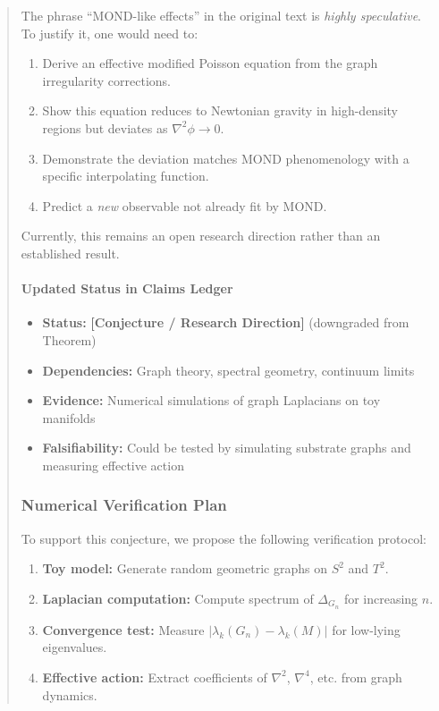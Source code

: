 \documentclass[11pt,titlepage]{article}
\begin{document}
\begin{abstract}
\begin{tcolorbox}[colback=red!5!white,colframe=red!75!black,title=Warning: Speculative Connection]
The phrase ``MOND-like effects'' in the original text is \emph{highly speculative}. To justify it, one would need to:
\begin{enumerate}
\item Derive an effective modified Poisson equation from the graph irregularity corrections.
\item Show this equation reduces to Newtonian gravity in high-density regions but deviates as $\nabla^2 \phi \to 0$.
\item Demonstrate the deviation matches MOND phenomenology with a specific interpolating function.
\item Predict a \emph{new} observable not already fit by MOND.
\end{enumerate}
Currently, this remains an open research direction rather than an established result.
\end{tcolorbox}

\paragraph{Updated Status in Claims Ledger}
\begin{itemize}
\item \textbf{Status:} \textbf{[Conjecture / Research Direction]} (downgraded from Theorem)
\item \textbf{Dependencies:} Graph theory, spectral geometry, continuum limits
\item \textbf{Evidence:} Numerical simulations of graph Laplacians on toy manifolds
\item \textbf{Falsifiability:} Could be tested by simulating substrate graphs and measuring effective action
\end{itemize}

\subsubsection{Numerical Verification Plan}
To support this conjecture, we propose the following verification protocol:

\begin{enumerate}
\item \textbf{Toy model:} Generate random geometric graphs on $S^2$ and $T^2$.
\item \textbf{Laplacian computation:} Compute spectrum of $\Delta_{G_n}$ for increasing $n$.
\item \textbf{Convergence test:} Measure $|\lambda_k(G_n) - \lambda_k(M)|$ for low-lying eigenvalues.
\item \textbf{Effective action:} Extract coefficients of $\nabla^2$, $\nabla^4$, etc. from graph dynamics.
\end{enumerate}


\end{abstract}
\end{document}
